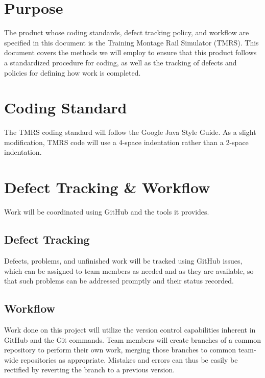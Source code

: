\documentclass{scrreprt}
\begin{document}
\section{Purpose}
The product whose coding standards, defect tracking policy, and workflow are specified in this document is the Training Montage Rail Simulator (TMRS). This document covers the methods we will employ to ensure that this product follows a standardized procedure for coding, as well as the tracking of defects and policies for defining how work is completed.

\section{Coding Standard}
The TMRS coding standard will follow the Google Java Style Guide. As a slight modification, TMRS code will use a 4-space indentation rather than a 2-space indentation.

\section{Defect Tracking \& Workflow}
Work will be coordinated using GitHub and the tools it provides.

\subsection{Defect Tracking}
Defects, problems, and unfinished work will be tracked using GitHub issues, which can be assigned to team members as needed and as they are available, so that such problems can be addressed promptly and their status recorded.

\subsection{Workflow}
Work done on this project will utilize the version control capabilities inherent in GitHub and the Git commands.  Team members will create branches of a common repository to perform their own work, merging those branches to common team-wide repositories as appropriate.  Mistakes and errors can thus be easily be rectified by reverting the branch to a previous version.
\end{document}
